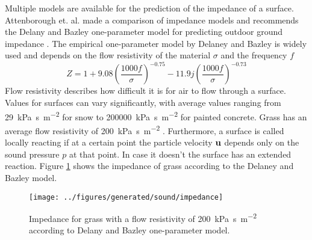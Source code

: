 Multiple models are available for the prediction of the impedance of a surface.
Attenborough et. al. made a comparison of impedance models and recommends the
Delany and Bazley one-parameter model for predicting outdoor ground impedance
\cite{Attenborough2011a}. The empirical one-parameter model by Delaney and
Bazley is widely used and depends on the flow resistivity of the material
$\sigma$ and the frequency $f$
\begin{equation}\label{eq:theory:sound:impedance:db}
 Z = 1 + 9.08 \left( \frac{1000f}{\sigma}\right)^{-0.75} - 11.9 j \left( \frac{1000f}{\sigma}\right)^{-0.73}
\end{equation}
Flow resistivity describes how difficult it is for air to flow through a
surface. Values for surfaces can vary significantly, with average values ranging
from \SI{29}{\kilo\pascal\second\per\square\meter} for snow to
\SI{200000}{\kilo\pascal\second\per\square\meter} for painted concrete. Grass
has an average flow resistivity of
\SI{200}{\kilo\pascal\second\per\square\meter} \cite{Crocker1997}.
Furthermore, a surface is called locally reacting if at a certain point the
particle velocity $\mathbf{u}$ depends only on the sound pressure $p$ at that
point. In case it doesn't the surface has an extended reaction.
Figure \ref{fig:theory:sound:impedance} shows the impedance of grass according to the Delaney and Bazley model.

\begin{figure}
        \centering
        \texttt{[image: ../figures/generated/sound/impedance]}
        \caption{Impedance for grass with a flow resistivity of \SI{200}{\kilo\pascal\second\per\square\meter} according to Delany and Bazley one-parameter model.}
        \label{fig:theory:sound:impedance}
\end{figure}


%

%
%
%


